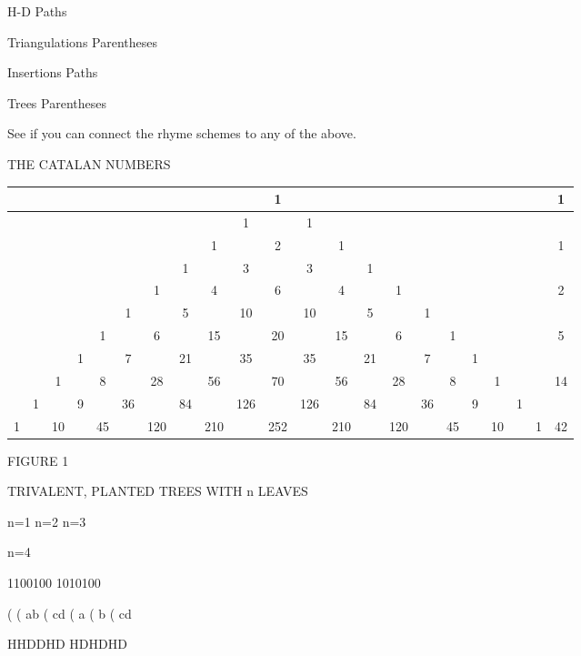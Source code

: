 \documentclass[10pt,letter]{article}
\begin{document}
H-D   Paths

Triangulations   Parentheses

Insertions   Paths

Trees   Parentheses

See if you can connect the rhyme schemes to any of the above.

THE CATALAN NUMBERS
\begin{longtable}[]{@{}cccccccccccccccccccccc@{}}
\toprule
& & & & & & & & & & 1 & & & & & & & & & & & 1\tabularnewline
\midrule
\endhead
& & & & & & & & & 1 & & 1 & & & & & & & & & &\tabularnewline
& & & & & & & & 1 & & 2 & & 1 & & & & & & & & & 1\tabularnewline
& & & & & & & 1 & & 3 & & 3 & & 1 & & & & & & & &\tabularnewline
& & & & & & 1 & & 4 & & 6 & & 4 & & 1 & & & & & & & 2\tabularnewline
& & & & & 1 & & 5 & & 10 & & 10 & & 5 & & 1 & & & & & &\tabularnewline
& & & & 1 & & 6 & & 15 & & 20 & & 15 & & 6 & & 1 & & & & &
5\tabularnewline
& & & 1 & & 7 & & 21 & & 35 & & 35 & & 21 & & 7 & & 1 & & &
&\tabularnewline
& & 1 & & 8 & & 28 & & 56 & & 70 & & 56 & & 28 & & 8 & & 1 & & &
14\tabularnewline
& 1 & & 9 & & 36 & & 84 & & 126 & & 126 & & 84 & & 36 & & 9 & & 1 &
&\tabularnewline
1 & & 10 & & 45 & & 120 & & 210 & & 252 & & 210 & & 120 & & 45 & & 10 &
& 1 & 42\tabularnewline
\bottomrule

\end{longtable}

FIGURE 1

TRIVALENT, PLANTED TREES WITH n LEAVES

n=1 n=2 n=3

n=4

1100100 1010100

( ( ab ( cd ( a ( b ( cd

HHDDHD HDHDHD
\end{document}
